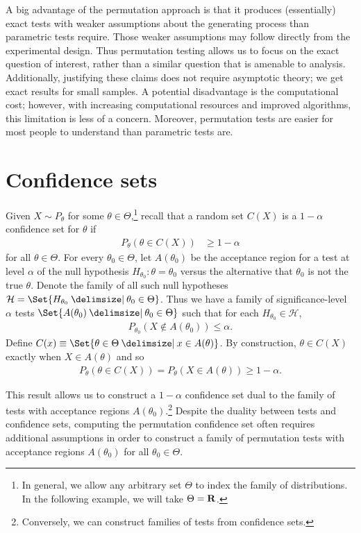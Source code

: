 A big advantage of the permutation approach is that it produces (essentially) exact 
tests with weaker assumptions 
about the generating process than parametric tests require.
Those weaker assumptions may follow directly from the 
experimental design.  Thus
permutation testing allows us to focus on the exact question of interest,
rather than a similar question that is amenable to analysis.  Additionally,
justifying these claims does not require asymptotic theory; 
we get exact results for small samples.  A potential disadvantage is the
computational cost; however, with increasing computational resources and
improved algorithms, this limitation is less of a concern.
Moreover, permutation tests are easier for most people to understand than
parametric tests are.

\section{Confidence sets}

Given $X \sim P_\theta$ for some $\theta \in \Theta$,\footnote{In general, we
allow any arbitrary set $\Theta$ to index the family of distributions. In
the following example, we will take $\Theta =\mathbf{R}$.} recall that a random
set $C(X)$ is a $1 - \alpha$ confidence set for $\theta$ if
\begin{align*}
P_\theta(\theta \in C(X)) &\ge 1 - \alpha
\end{align*}
for all $\theta \in \Theta$.
For every $\theta_0 \in \Theta$, let $A(\theta_0)$ be the acceptance region for
a test at level $\alpha$ of the null hypothesis $H_{\theta_0}: \theta =
\theta_0$ versus the alternative that $\theta_0$ is not the true $\theta$.
Denote the family of all such null hypotheses $\mathcal{H} = \Set{H_{\theta_0}
\given \theta_0 \in \Theta}$.  Thus we have a family of significance-level
$\alpha$ tests $\Set{A(\theta_0) \given \theta_0 \in \Theta}$ such that for
each $H_{\theta_0} \in \mathcal{H}$,
\begin{align*}
P_{\theta_0}(X \notin A(\theta_0)) \le \alpha.
\end{align*}
Define $C(x) \equiv \Set{\theta \in \Theta \given x \in A(\theta)}$.
By construction, $\theta \in C(X)$ exactly when $X \in A(\theta)$ and so
\begin{align*}
P_{\theta}(\theta \in C(X)) = P_{\theta}(X \in A(\theta)) \ge 1 - \alpha.
\end{align*}

This result allows us to construct a $1-\alpha$ confidence set dual to
the family of tests with acceptance regions $A(\theta_0)$.\footnote{Conversely,
we can construct families of tests from confidence sets.}  Despite the duality
between tests and confidence sets, computing the permutation confidence set
often requires additional assumptions in order to construct a family of
permutation tests with acceptance regions $A(\theta_0)$ for all $\theta_0 \in
\Theta$.

